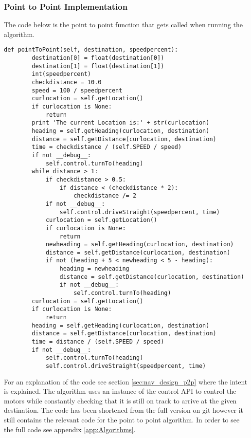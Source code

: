 \subsubsection{Point to Point Implementation}
The code below is the point to point function that gets called when running the algorithm.
\begin{lstlisting}[style=custompython, label=point-to-point, caption=shortened point to point algorithm code]
    def pointToPoint(self, destination, speedpercent):
        destination[0] = float(destination[0])
        destination[1] = float(destination[1])
        int(speedpercent)
        checkdistance = 10.0
        speed = 100 / speedpercent
        curlocation = self.getLocation()
        if curlocation is None:
            return
        print 'The current Location is:' + str(curlocation)
        heading = self.getHeading(curlocation, destination)
        distance = self.getDistance(curlocation, destination)
        time = checkdistance / (self.SPEED / speed)
        if not __debug__:
            self.control.turnTo(heading)
        while distance > 1:
            if checkdistance > 0.5:
                if distance < (checkdistance * 2):
                    checkdistance /= 2
            if not __debug__:
                self.control.driveStraight(speedpercent, time)
            curlocation = self.getLocation()
            if curlocation is None:
                return
            newheading = self.getHeading(curlocation, destination)
            distance = self.getDistance(curlocation, destination)
            if not (heading + 5 < newheading < 5 - heading):
                heading = newheading
                distance = self.getDistance(curlocation, destination)
                if not __debug__:
                    self.control.turnTo(heading)
        curlocation = self.getLocation()
        if curlocation is None:
            return
        heading = self.getHeading(curlocation, destination)
        distance = self.getDistance(curlocation, destination)
        time = distance / (self.SPEED / speed)
        if not __debug__:
            self.control.turnTo(heading)
            self.control.driveStraight(speedpercent, time)
\end{lstlisting}
For an explanation of the code see section \ref{sec:nav_design_p2p} where the intent is explained. The algorithm uses an instance of the control API to control the motors while constantly checking that it is still on track to arrive at the given destination. The code has been shortened from the full version on git however it still contains the relevant code for the point to point algorithm. In order to see the full code see appendix \ref{app:Algorithms}.
